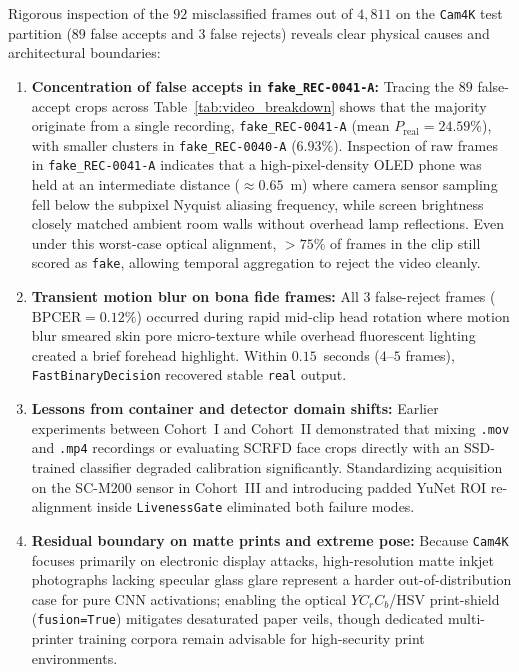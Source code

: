 Rigorous inspection of the $92$ misclassified frames out of $4{,}811$ on the \texttt{Cam4K} test partition ($89$ false accepts and $3$ false rejects) reveals clear physical causes and architectural boundaries:
\begin{enumerate}
    \item \textbf{Concentration of false accepts in \texttt{fake\_REC-0041-A}:} Tracing the $89$ false-accept crops across Table~\ref{tab:video_breakdown} shows that the majority originate from a single recording, \texttt{fake\_REC-0041-A} (mean $P_{\text{real}} = 24.59\%$), with smaller clusters in \texttt{fake\_REC-0040-A} ($6.93\%$). Inspection of raw frames in \texttt{fake\_REC-0041-A} indicates that a high-pixel-density OLED phone was held at an intermediate distance ($\approx 0.65$~m) where camera sensor sampling fell below the subpixel Nyquist aliasing frequency, while screen brightness closely matched ambient room walls without overhead lamp reflections. Even under this worst-case optical alignment, $>75\%$ of frames in the clip still scored as \texttt{fake}, allowing temporal aggregation to reject the video cleanly.
    \item \textbf{Transient motion blur on bona fide frames:} All $3$ false-reject frames ($\text{BPCER} = 0.12\%$) occurred during rapid mid-clip head rotation where motion blur smeared skin pore micro-texture while overhead fluorescent lighting created a brief forehead highlight. Within $0.15$~seconds ($4$--$5$ frames), \texttt{FastBinaryDecision} recovered stable \texttt{real} output.
    \item \textbf{Lessons from container and detector domain shifts:} Earlier experiments between Cohort~I and Cohort~II demonstrated that mixing \texttt{.mov} and \texttt{.mp4} recordings or evaluating SCRFD face crops directly with an SSD-trained classifier degraded calibration significantly. Standardizing acquisition on the SC-M200 sensor in Cohort~III and introducing padded YuNet ROI re-alignment inside \texttt{LivenessGate} eliminated both failure modes.
    \item \textbf{Residual boundary on matte prints and extreme pose:} Because \texttt{Cam4K} focuses primarily on electronic display attacks, high-resolution matte inkjet photographs lacking specular glass glare represent a harder out-of-distribution case for pure CNN activations; enabling the optical $YC_rC_b$/HSV print-shield (\texttt{fusion=True}) mitigates desaturated paper veils, though dedicated multi-printer training corpora remain advisable for high-security print environments.
\end{enumerate}

